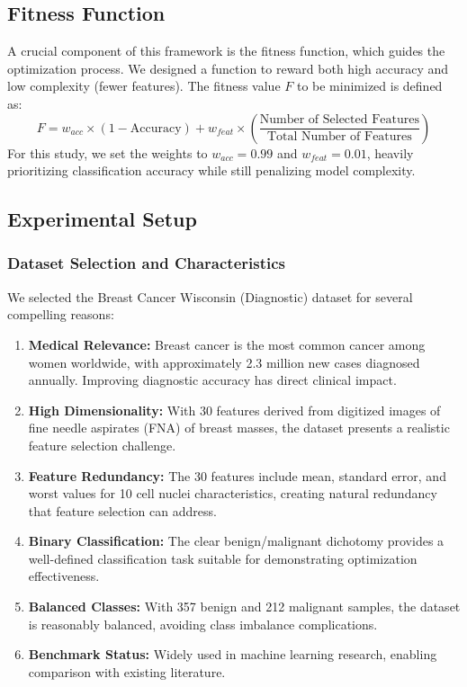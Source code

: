\documentclass[12pt, a4paper]{article}
\begin{document}
\subsection{Fitness Function}
A crucial component of this framework is the fitness function, which guides the optimization process. We designed a function to reward both high accuracy and low complexity (fewer features). The fitness value $F$ to be minimized is defined as:
\begin{equation}
    F = w_{acc} \times (1 - \text{Accuracy}) + w_{feat} \times \left( \frac{\text{Number of Selected Features}}{\text{Total Number of Features}} \right)
\end{equation}
For this study, we set the weights to $w_{acc} = 0.99$ and $w_{feat} = 0.01$, heavily prioritizing classification accuracy while still penalizing model complexity.

\subsection{Experimental Setup}
\subsubsection{Dataset Selection and Characteristics}
We selected the Breast Cancer Wisconsin (Diagnostic) dataset for several compelling reasons:
\begin{enumerate}
    \item \textbf{Medical Relevance:} Breast cancer is the most common cancer among women worldwide, with approximately 2.3 million new cases diagnosed annually. Improving diagnostic accuracy has direct clinical impact.
    \item \textbf{High Dimensionality:} With 30 features derived from digitized images of fine needle aspirates (FNA) of breast masses, the dataset presents a realistic feature selection challenge.
    \item \textbf{Feature Redundancy:} The 30 features include mean, standard error, and worst values for 10 cell nuclei characteristics, creating natural redundancy that feature selection can address.
    \item \textbf{Binary Classification:} The clear benign/malignant dichotomy provides a well-defined classification task suitable for demonstrating optimization effectiveness.
    \item \textbf{Balanced Classes:} With 357 benign and 212 malignant samples, the dataset is reasonably balanced, avoiding class imbalance complications.
    \item \textbf{Benchmark Status:} Widely used in machine learning research, enabling comparison with existing literature.
\end{enumerate}
\end{document}
